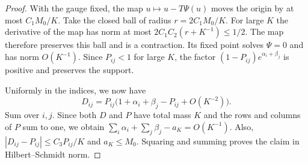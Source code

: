 \begin{proof}
With the gauge fixed, the map $u\mapsto u-T\Psi(u)$ moves the origin by at most $C_1M_0/K$.
Take the closed ball of radius $r=2C_1M_0/K$. For large $K$ the derivative of the map has norm
at most $2C_1C_2(r+K^{-1})\le1/2$. The map therefore preserves this ball and is a contraction.
Its fixed point solves $\Psi=0$ and has norm $O(K^{-1})$. Since $P_{ij}<1$ for large $K$, the
factor $(1-P_{ij})e^{\alpha_i+\beta_j}$ is positive and preserves the support.

Uniformly in the indices, we now have
\[
 D_{ij}=P_{ij}\bigl(1+\alpha_i+\beta_j-P_{ij}+O(K^{-2})\bigr).
\]
Sum over $i,j$. Since both $D$ and $P$ have total mass $K$ and the rows and columns of $P$ sum
to one, we obtain $\sum_i\alpha_i+\sum_j\beta_j-a_K=O(K^{-1})$. Also,
$|D_{ij}-P_{ij}|\le C_3P_{ij}/K$ and $a_K\le M_0$. Squaring and summing proves the claim in
Hilbert--Schmidt norm.
\end{proof}
